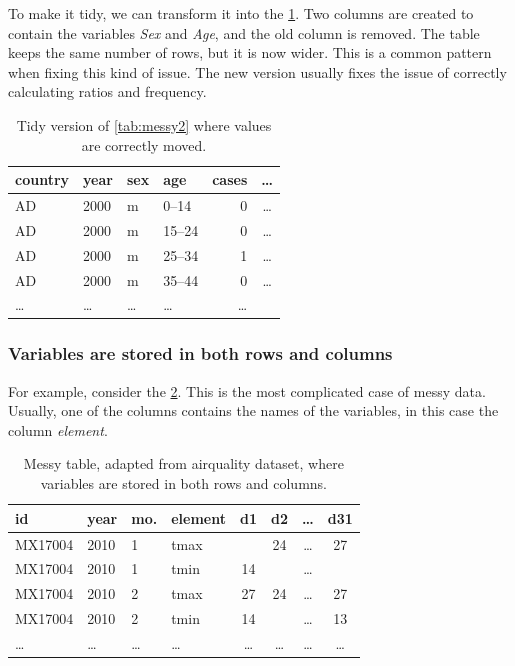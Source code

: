To make it tidy, we can transform it into the \cref{tab:tidy2}.  Two columns are created
to contain the variables \emph{Sex} and \emph{Age}, and the old column is removed.  The
table keeps the same number of rows, but it is now wider.  This is a common pattern when
fixing this kind of issue.  The new version usually fixes the issue of correctly
calculating ratios and frequency.

\begin{table}
  \centering
  \begin{tabular}{l l l l r c}
    \toprule
    \textbf{country} & \textbf{year} & \textbf{sex} & \textbf{age} & \textbf{cases} & \textbf{\dots} \\
    \midrule
    AD & 2000 & m & 0--14 & 0 & \dots \\
    AD & 2000 & m & 15--24 & 0 & \dots \\
    AD & 2000 & m & 25--34 & 1 & \dots \\
    AD & 2000 & m & 35--44 & 0 & \dots \\
    \dots & \dots & \dots & \dots & \dots \\
    \bottomrule
  \end{tabular}
  \caption{Tidy version of \cref{tab:messy2} where values are correctly moved.}
  \label{tab:tidy2}
\end{table}

\subsubsection{Variables are stored in both rows and columns}  For example, consider the
\cref{tab:messy3}.  This is the most complicated case of messy data.  Usually, one of the
columns contains the names of the variables, in this case the column \emph{element}.

\begin{table}
  \centering
  \begin{tabular}{llllcccc}
    \toprule
    \textbf{id} & \textbf{year} & \textbf{mo.} & \textbf{element} & \textbf{d1} & \textbf{d2} & \textbf{\dots} & \textbf{d31} \\
    \midrule
    MX17004 & 2010 & 1 & tmax &    & 24 & \dots & 27 \\
    MX17004 & 2010 & 1 & tmin & 14 &    & \dots &    \\
    MX17004 & 2010 & 2 & tmax & 27 & 24 & \dots & 27 \\
    MX17004 & 2010 & 2 & tmin & 14 &    & \dots & 13 \\
    \dots & \dots & \dots & \dots & \dots & \dots & \dots & \dots \\
    \bottomrule
  \end{tabular}
  \caption{Messy table, adapted from airquality dataset, where variables are stored in both rows and columns.}
  \label{tab:messy3}
\end{table}

